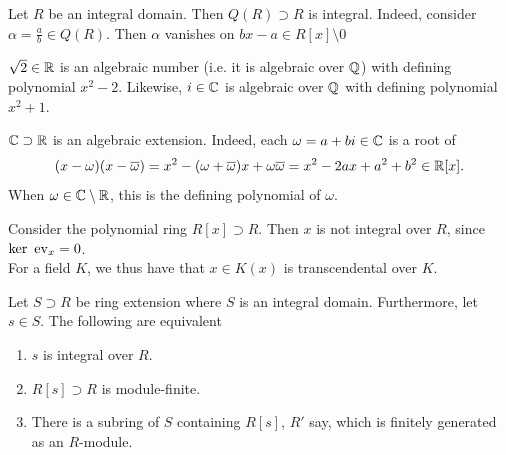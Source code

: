 \begin{example}
    Let $R$ be an integral domain. Then $Q(R)\supset R$ is integral. Indeed, consider $\alpha=\frac{a}{b}\in Q(R)$. Then $\alpha$ vanishes on $bx-a\in R[x]\setminus 0$ 
\end{example}
\begin{example}
    $\sqrt{2}\in \mathbb{R}$ is an algebraic number (i.e. it is algebraic over $\mathbb{Q}$) with defining polynomial $x^2-2$. Likewise, $i\in \mathbb{C}$ is algebraic over $\mathbb{Q}$ with defining polynomial $x^2+1$. 
\end{example}
\begin{example}
    $\mathbb{C}\supset \mathbb{R}$ is an algebraic extension. Indeed, each $\omega = a + bi \in \mathbb{C}$ is a root of 
    $$
        (x-\omega)(x-\overline{\omega}) = x^2 -(\omega+\overline{\omega})x +\omega\overline{\omega} = x^2-2ax+a^2+b^2\in \mathbb{R}[x].
    $$  
    When $\omega \in \mathbb{C}\setminus \mathbb{R}$, this is the defining polynomial of $\omega$. 
\end{example}
\begin{example}
    Consider the polynomial ring $R[x]\supset R$. Then $x$ is not integral over $R$, since $\ker \ \mathrm{ev}_x = 0$.\\
    For a field $K$, we thus have that $x\in K(x)$ is transcendental over $K$. 
\end{example}
\begin{lemma}\label{EquivalentFormulationsOfIntegralElements}
    Let $S\supset R$ be ring extension where $S$ is an integral domain. Furthermore, let $s\in S$. The following are equivalent
    \begin{enumerate}
        \item $s$ is integral over $R$.
        \item $R[s]\supset R$ is module-finite.
        \item There is a subring of $S$ containing $R[s]$, $R'$ say, which is finitely generated as an $R$-module.   
    \end{enumerate}
\end{lemma}
